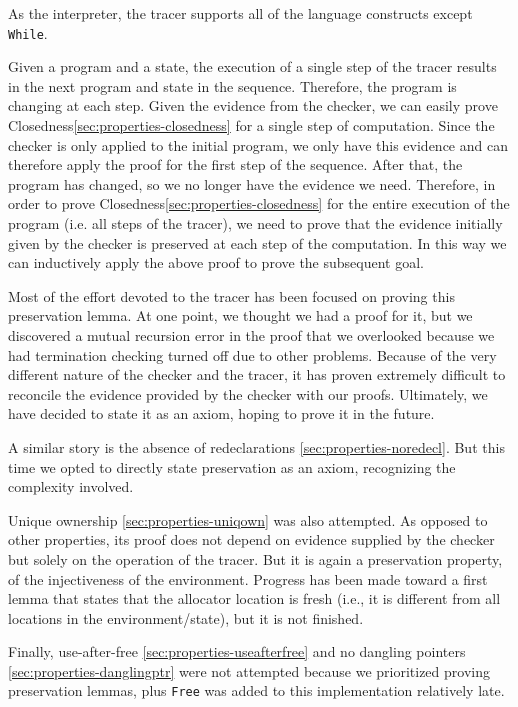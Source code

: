 As the interpreter, the tracer supports all of the language constructs except \texttt{While}.

Given a program and a state, the execution of a single step of the tracer results in the next program and state in the sequence. Therefore, the program is changing at each step. Given the evidence from the checker, we can easily prove Closedness\ref{sec:properties-closedness} for a single step of computation.
Since the checker is only applied to the initial program, we only have this evidence and can therefore apply the proof for the first step of the sequence. After that, the program has changed, so we no longer have the evidence we need. Therefore, in order to prove Closedness\ref{sec:properties-closedness} for the entire execution of the program (i.e. all steps of the tracer), we need to prove that the evidence initially given by the checker is preserved at each step of the computation. In this way we can inductively apply the above proof to prove the subsequent goal.

Most of the effort devoted to the tracer has been focused on proving this preservation lemma. At one point, we thought we had a proof for it, but we discovered a mutual recursion error in the proof that we overlooked because we had termination checking turned off due to other problems. Because of the very different nature of the checker and the tracer, it has proven extremely difficult to reconcile the evidence provided by the checker with our proofs. Ultimately, we have decided to state it as an axiom, hoping to prove it in the future.

A similar story is the absence of redeclarations \ref{sec:properties-noredecl}. But this time we opted to directly state preservation as an axiom, recognizing the complexity involved.

Unique ownership \ref{sec:properties-uniqown} was also attempted. As opposed to other properties, its proof does not depend on evidence supplied by the checker but solely on the operation of the tracer. But it is again a preservation property, of the injectiveness of the environment. Progress has been made toward a first lemma that states that the allocator location is fresh (i.e., it is different from all locations in the environment/state), but it is not finished.

Finally, use-after-free \ref{sec:properties-useafterfree} and no dangling pointers \ref{sec:properties-danglingptr} were not attempted because we prioritized proving preservation lemmas, plus \texttt{Free} was added to this implementation relatively late.






